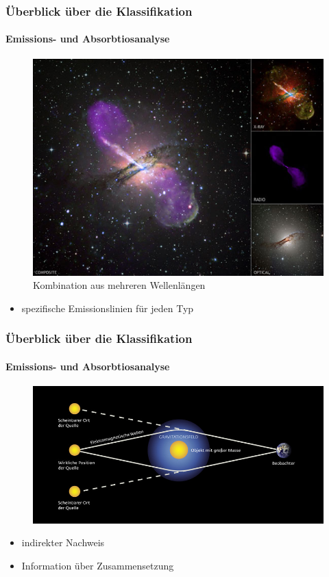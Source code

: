 \begin{frame}
\frametitle{Überblick über die Klassifikation}
\framesubtitle{Emissions- und Absorbtiosanalyse}


\begin{figure}
\includegraphics[scale=0.35]{Radiogalaxie.jpg}
\caption{Kombination aus mehreren Wellenlängen}
\end{figure}

\begin{itemize}
\item spezifische Emissionslinien für jeden Typ
\end{itemize}

\end{frame}


\begin{frame}
\frametitle{Überblick über die Klassifikation}
\framesubtitle{Emissions- und Absorbtiosanalyse}

\begin{figure}
\includegraphics[scale=0.7]{Gravitationslinse.jpg}
\end{figure}

\begin{itemize}
\item indirekter Nachweis
\item Information über Zusammensetzung
\end{itemize}

\end{frame}


